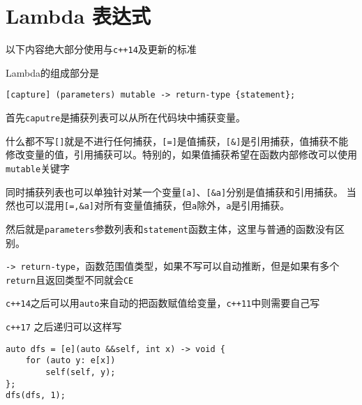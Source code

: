 \section{Lambda 表达式}
以下内容绝大部分使用与\verb|c++14|及更新的标准

Lambda的组成部分是
\begin{lstlisting}
[capture] (parameters) mutable -> return-type {statement};
\end{lstlisting}
首先\verb|caputre|是捕获列表可以从所在代码块中捕获变量。

什么都不写\verb|[]|就是不进行任何捕获，\verb|[=]|是值捕获，\verb|[&]|是引用捕获，值捕获不能修改变量的值，引用捕获可以。特别的，如果值捕获希望在函数内部修改可以使用\verb|mutable|关键字

同时捕获列表也可以单独针对某一个变量\verb|[a]|、\verb|[&a]|分别是值捕获和引用捕获。 当然也可以混用\verb|[=,&a]|对所有变量值捕获，但\verb|a|除外，\verb|a|是引用捕获。

然后就是\verb|parameters|参数列表和\verb|statement|函数主体，这里与普通的函数没有区别。

\verb|-> return-type|，函数范围值类型，如果不写可以自动推断，但是如果有多个\verb|return|且返回类型不同就会\verb|CE|

\verb|c++14|之后可以用\verb|auto|来自动的把函数赋值给变量，\verb|c++11|中则需要自己写

\verb|c++17| 之后递归可以这样写
\begin{lstlisting}
auto dfs = [e](auto &&self, int x) -> void {
    for (auto y: e[x])
        self(self, y);
};
dfs(dfs, 1);
\end{lstlisting}